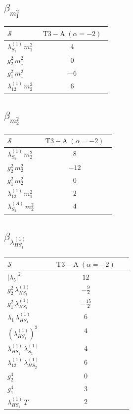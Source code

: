 \documentclass[9pt]{article}
\begin{document}
\subsection*{$ \beta_{m_1^{2}} $}
\begin{longtable}{@{}p{0.31\linewidth}c@{}}
\toprule
$\mathcal{S}$ & $ \mathrm{T3-A}\;(\alpha=-2) $ \\
\midrule
$ \lambda_{S_1}^{(1)}\,m_1^{2} $ & $ 4 $ \\
$ g_2^2\,m_1^{2} $ & $ 0 $ \\
$ g_1^2\,m_1^{2} $ & $ -6 $ \\
$ \lambda_{12}^{(1)}\,m_2^{2} $ & $ 6 $ \\
\bottomrule
\end{longtable}
\subsection*{$ \beta_{m_2^{2}} $}
\begin{longtable}{@{}p{0.31\linewidth}c@{}}
\toprule
$\mathcal{S}$ & $ \mathrm{T3-A}\;(\alpha=-2) $ \\
\midrule
$ \lambda_{S_2}^{(1)}\,m_2^{2} $ & $ 8 $ \\
$ g_2^2\,m_2^{2} $ & $ -12 $ \\
$ g_1^2\,m_2^{2} $ & $ 0 $ \\
$ \lambda_{12}^{(1)}\,m_1^{2} $ & $ 2 $ \\
$ \lambda_{S_2}^{(A)}\,m_2^{2} $ & $ 4 $ \\
\bottomrule
\end{longtable}
\subsection*{$ \beta_{\lambda_{HS_1}^{(1)}} $}
\begin{longtable}{@{}p{0.31\linewidth}c@{}}
\toprule
$\mathcal{S}$ & $ \mathrm{T3-A}\;(\alpha=-2) $ \\
\midrule
$ |\lambda_5|^2 $ & $ 12 $ \\
$ g_2^2\,\lambda_{HS_1}^{(1)} $ & $ - \frac{9}{2} $ \\
$ g_1^2\,\lambda_{HS_1}^{(1)} $ & $ - \frac{15}{2} $ \\
$ \lambda_1\,\lambda_{HS_1}^{(1)} $ & $ 6 $ \\
$ \left(\lambda_{HS_1}^{(1)}\right)^2 $ & $ 4 $ \\
$ \lambda_{HS_1}^{(1)}\,\lambda_{S_1}^{(1)} $ & $ 4 $ \\
$ \lambda_{12}^{(1)}\,\lambda_{HS_2}^{(1)} $ & $ 6 $ \\
$ g_2^4 $ & $ 0 $ \\
$ g_1^4 $ & $ 3 $ \\
$ \lambda_{HS_1}^{(1)}\,T $ & $ 2 $ \\
\bottomrule
\end{longtable}
\end{document}
